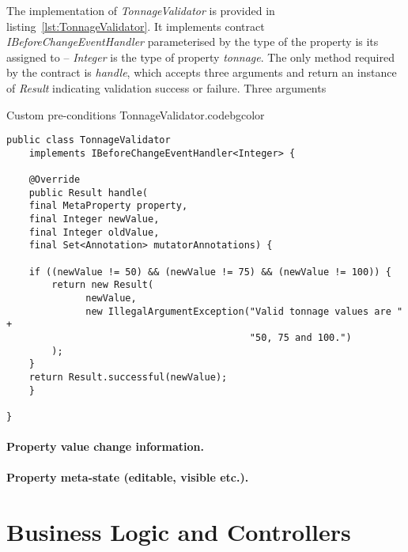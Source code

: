   The implementation of \emph{TonnageValidator} is provided in listing~\ref{lst:TonnageValidator}.
  It implements contract \emph{IBeforeChangeEventHandler} parameterised by the type of the property is its assigned to -- \emph{Integer} is the type of property \emph{tonnage}.
  The only method required by the contract is \emph{handle}, which accepts three arguments and return an instance of \emph{Result} indicating validation success or failure.
  Three arguments

  \begin{code}{Custom pre-conditions TonnageValidator.}{\label{lst:TonnageValidator}}{codebgcolor}
    \begin{lstlisting}
public class TonnageValidator 
    implements IBeforeChangeEventHandler<Integer> {

    @Override
    public Result handle(
	final MetaProperty property, 
	final Integer newValue, 
	final Integer oldValue, 
	final Set<Annotation> mutatorAnnotations) {
	
	if ((newValue != 50) && (newValue != 75) && (newValue != 100)) {
	    return new Result(
		      newValue, 
		      new IllegalArgumentException("Valid tonnage values are " +
	    		                           "50, 75 and 100.")
	    );
	}
	return Result.successful(newValue);
    }

}
    \end{lstlisting}
  \end{code}



  \paragraph*{Property value change information.}
  \paragraph*{Property meta-state (editable, visible etc.).}

\section{Business Logic and Controllers}

% 
% 
% 
% 
